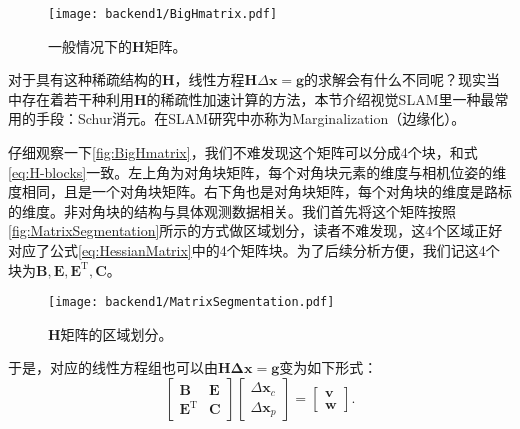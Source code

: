\begin{figure}[!ht]
	\centering
	\texttt{[image: backend1/BigHmatrix.pdf]}
	\caption{一般情况下的$\bm{H}$矩阵。}
	\label{fig:BigHmatrix}
\end{figure}

对于具有这种稀疏结构的$\bm{H}$，线性方程$\bm{H} \Delta \bm{x}= \bm{g}$的求解会有什么不同呢？现实当中存在着若干种利用$\bm{H}$的稀疏性加速计算的方法，本节介绍视觉SLAM里一种最常用的手段：Schur消元。在SLAM研究中亦称为Marginalization（边缘化）。

仔细观察一下\autoref{fig:BigHmatrix}，我们不难发现这个矩阵可以分成4个块，和式\eqref{eq:H-blocks}一致。左上角为对角块矩阵，每个对角块元素的维度与相机位姿的维度相同，且是一个对角块矩阵。右下角也是对角块矩阵，每个对角块的维度是路标的维度。非对角块的结构与具体观测数据相关。我们首先将这个矩阵按照\autoref{fig:MatrixSegmentation}所示的方式做区域划分，读者不难发现，这4个区域正好对应了公式\eqref{eq:HessianMatrix}中的4个矩阵块。为了后续分析方便，我们记这4个块为$\bm{B}, \bm{E}, \bm{E}^\mathrm{T}, \bm{C}$。

\begin{figure}[!ht]
	\centering
	\texttt{[image: backend1/MatrixSegmentation.pdf]}
	\caption{$\bm{H}$矩阵的区域划分。}
	\label{fig:MatrixSegmentation}
\end{figure}

于是，对应的线性方程组也可以由$\bm{H\Delta x} = \bm{g}$变为如下形式：
\begin{equation}
\label{eq:linearequations}
 \left[ \begin{matrix}
\bm{B}   &   \bm{E} \\
\bm{E^\mathrm{T}} &   \bm{C}
\end{matrix}\right] 
\left[ \begin{array}{l}
\Delta \bm{x}_c \\
\Delta \bm{x}_p 
\end{array} \right] = 
\left[ \begin{array}{l}
\bm{v} \\
\bm{w} 
\end{array} \right].
\end{equation}

